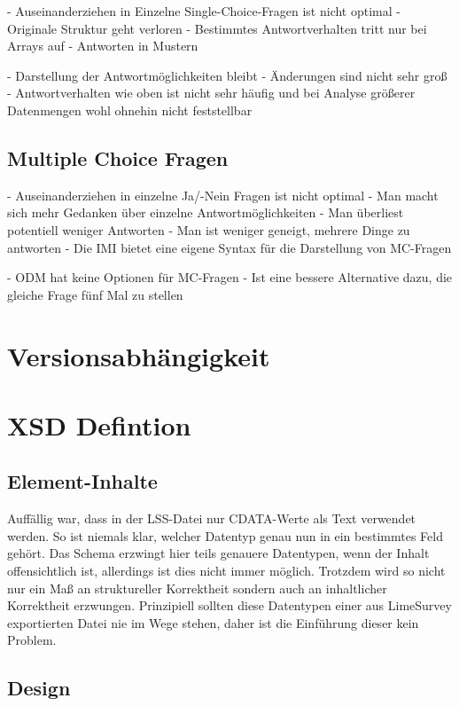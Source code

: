 - Auseinanderziehen in Einzelne Single-Choice-Fragen ist nicht optimal
	- Originale Struktur geht verloren
- Bestimmtes Antwortverhalten tritt nur bei Arrays auf
	- Antworten in Mustern

- Darstellung der Antwortmöglichkeiten bleibt
	- Änderungen sind nicht sehr groß
	- Antwortverhalten wie oben ist nicht sehr häufig und bei Analyse größerer Datenmengen wohl ohnehin nicht feststellbar

\subsection{Multiple Choice Fragen}

- Auseinanderziehen in einzelne Ja/-Nein Fragen ist nicht optimal
	- Man macht sich mehr Gedanken über einzelne Antwortmöglichkeiten
	- Man überliest potentiell weniger Antworten
	- Man ist weniger geneigt, mehrere Dinge zu antworten
- Die IMI bietet eine eigene Syntax für die Darstellung von MC-Fragen

- ODM hat keine Optionen für MC-Fragen
	- Ist eine bessere Alternative dazu, die gleiche Frage fünf Mal zu stellen

\section{Versionsabhängigkeit}

\section{XSD Defintion}

\subsection{Element-Inhalte}

Auffällig war, dass in der LSS-Datei nur CDATA-Werte als Text verwendet werden.
So ist niemals klar, welcher Datentyp genau nun in ein bestimmtes Feld gehört.
Das Schema erzwingt hier teils genauere Datentypen, wenn der Inhalt offensichtlich ist, allerdings ist dies nicht immer möglich.
Trotzdem wird so nicht nur ein Maß an struktureller Korrektheit sondern auch an inhaltlicher Korrektheit erzwungen.
Prinzipiell sollten diese Datentypen einer aus LimeSurvey exportierten Datei nie im Wege stehen, daher ist die Einführung dieser kein Problem.

\subsection{Design}

